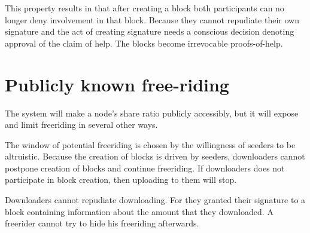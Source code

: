 This property results in that after creating a block
both participants can no longer deny involvement in that block.
Because they cannot repudiate their own signature
and the act of creating signature needs a conscious decision denoting approval of the claim of help.
The blocks become irrevocable proofs-of-help.

\section{Publicly known free-riding}
The system will make a node's share ratio publicly accessibly,
but it will expose and limit freeriding in several other ways.

The window of potential freeriding is chosen by the willingness of seeders to be altruistic.
Because the creation of blocks is driven by seeders,
downloaders cannot postpone creation of blocks and continue freeriding.
If downloaders does not participate in block creation,
then uploading to them will stop.

Downloaders cannot repudiate downloading.
For they granted their signature to a block containing information about the amount that they downloaded.
A freerider cannot try to hide his freeriding afterwards.
